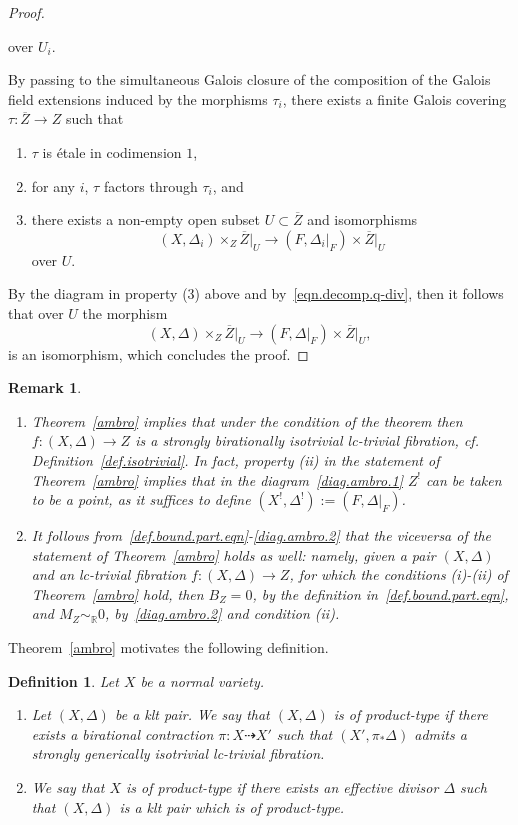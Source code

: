 \documentclass{amsart}[12pt,a4paper]
\newtheorem{definition}[theorem]{Definition}
\newtheorem{remark}[theorem]{Remark}
\theoremstyle{definition}
\begin{document}
\begin{proof}
\begin{enumerate}
\[\] 
over $U_i$.
\end{enumerate}
By passing to the simultaneous Galois closure of the composition of the Galois field extensions induced by the morphisms $\tau_i$, there exists a finite Galois covering  $\tau \colon \overline{Z} \to Z$ such that 
\begin{enumerate}
\item
$\tau$ is \'etale in codimension $1$,
\item 
for any $i$, $\tau$ factors through $\tau_i$, and
\item
there exists a non-empty open subset $U\subset \overline{Z}$ and isomorphisms 
\[
(X,\Delta_i)\times_Z \overline{Z} \vert_{U} \rightarrow (F,\Delta_i\vert_F) \times \overline{Z}\vert_{U}
\] 
over $U$.
\end{enumerate}
By the diagram in property (3) above and by~\eqref{eqn.decomp.q-div}, then it follows that over $U$ the morphism
\[
(X,\Delta)\times_Z \overline{Z} \vert_{U} \rightarrow (F,\Delta\vert_F) \times \overline{Z}\vert_{U},
\] 
is an isomorphism, which concludes the proof.
\end{proof}

\begin{remark}
\label{rmk.bir.isotr}
\begin{enumerate}
\item 
Theorem~\ref{ambro} implies that under the condition of the theorem then $f\colon (X, \Delta)\rightarrow Z$ is a strongly birationally isotrivial lc-trivial fibration, cf. Definition~\ref{def.isotrivial}.
In fact, property (ii) in the statement of Theorem~\ref{ambro} implies that in the diagram~\eqref{diag.ambro.1} $Z^!$ can be taken to be a point, as it suffices to define $(X^!, \Delta^!):=(F, \Delta\vert_F)$.
\item 
It follows from~\eqref{def.bound.part.eqn}-\eqref{diag.ambro.2} that the viceversa of the statement of Theorem~\ref{ambro} holds as well: namely, given a pair $(X, \Delta)$ and an lc-trivial fibration $f \colon (X, \Delta) \to Z$, for which the conditions (i)-(ii) of Theorem~\ref{ambro} hold, then $B_Z=0$, by the definition in~\eqref{def.bound.part.eqn}, and $M_Z\sim_\mathbb{R} 0$, by~\eqref{diag.ambro.2} and condition (ii).
\end{enumerate}
\end{remark}

Theorem~\ref{ambro} motivates the following definition.

\begin{definition}
\label{defproduct}
Let $X$ be a normal variety.
\begin{enumerate}
\item[(i)] 
Let $(X,\Delta)$ be a klt pair.
We say that $(X,\Delta)$ is of product-type if there exists a birational contraction $\pi\colon X \dashrightarrow X'$ such that $(X', \pi_* \Delta)$ admits a strongly generically isotrivial lc-trivial fibration.
\item[(ii)]
We say that $X$ is of product-type if there exists an effective divisor $\Delta$ such that $(X, \Delta)$ is a klt pair which is of product-type.
\end{enumerate}
\end{definition}
\end{document}

